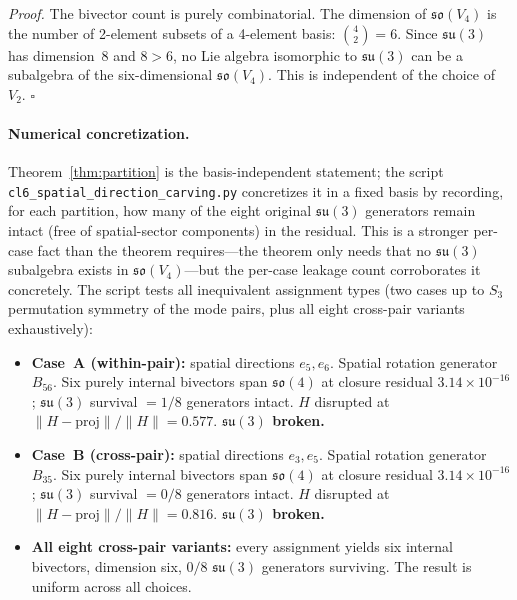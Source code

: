 \documentclass[aip,jmp,amsmath,amssymb,reprint,author-year]{revtex4-2}
\newenvironment{proof}[1][Proof]{\par\noindent\textit{#1.}\space\ignorespaces}{\hfill$\square$\par\medskip}
\begin{document}
\begin{proof}
The bivector count is purely combinatorial.  The dimension of
$\mathfrak{so}(V_4)$ is the number of 2-element subsets of a 4-element
basis: $\binom{4}{2} = 6$.  Since $\mathfrak{su}(3)$ has dimension~8
and $8 > 6$, no Lie algebra isomorphic to $\mathfrak{su}(3)$ can be a
subalgebra of the six-dimensional $\mathfrak{so}(V_4)$.  This is
independent of the choice of $V_2$.
\end{proof}

\paragraph{Numerical concretization.}
Theorem~\ref{thm:partition} is the basis-independent statement; the
script \texttt{cl6\_spatial\_direction\_carving.py} concretizes it in a
fixed basis by recording, for each partition, how many of the eight
original $\mathfrak{su}(3)$ generators remain intact (free of
spatial-sector components) in the residual.  This is a stronger per-case
fact than the theorem requires---the theorem only needs that no
$\mathfrak{su}(3)$ subalgebra exists in $\mathfrak{so}(V_4)$---but the
per-case leakage count corroborates it concretely.  The script tests all
inequivalent assignment types (two cases up to $S_3$ permutation symmetry
of the mode pairs, plus all eight cross-pair variants exhaustively):

\begin{itemize}
\item \textbf{Case~A (within-pair):} spatial directions $e_5, e_6$.
  Spatial rotation generator $B_{56}$.  Six purely internal bivectors
  span $\mathfrak{so}(4)$ at closure residual $3.14 \times 10^{-16}$;
  $\mathfrak{su}(3)$ survival $= 1/8$ generators intact.  $H$ disrupted
  at $\|H - \mathrm{proj}\|/\|H\| = 0.577$.
  \textbf{$\mathfrak{su}(3)$ broken.}

\item \textbf{Case~B (cross-pair):} spatial directions $e_3, e_5$.
  Spatial rotation generator $B_{35}$.  Six purely internal bivectors
  span $\mathfrak{so}(4)$ at closure residual $3.14 \times 10^{-16}$;
  $\mathfrak{su}(3)$ survival $= 0/8$ generators intact.  $H$ disrupted
  at $\|H - \mathrm{proj}\|/\|H\| = 0.816$.
  \textbf{$\mathfrak{su}(3)$ broken.}

\item \textbf{All eight cross-pair variants:} every assignment yields six
  internal bivectors, dimension six, $0/8$ $\mathfrak{su}(3)$ generators
  surviving.  The result is uniform across all choices.
\end{itemize}
\end{document}
